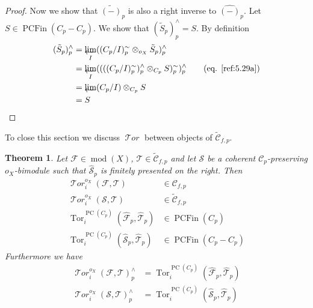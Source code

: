 \documentclass{amsproc}
\def\Cscr{{\mathcal C}}
\def\Fscr{{\mathcal F}}
\def\Sscr{{\mathcal S}}
\def\Tscr{{\mathcal T}}
\def\HTor{\operatorname {\Tscr \mathit{or}}}
\def\HTor{\operatorname {\Tscr \mathit{or}}}
\def\Tor{\operatorname {Tor}}
\def\coh{\operatorname {mod}}
\let\oldtext\text
\def\text#1{\oldtext{\upshape #1}}
\let\invlim\projlim
\DeclareMathOperator{\PC}{PC}
\DeclareMathOperator{\PCFin}{PCFin}
\newtheorem{theorems}[lemmas]{Theorem}
\theoremstyle{definition}
\theoremstyle{remark}
\def\invlim{\mathop{\vtop{\baselineskip -100pt\lineskip -1pt\lineskiplimit 0pt
\setbox0\hbox{\upshape lim}\copy0\hbox to \wd0{\leftarrowfill}}}\limits}
\numberwithin{equation}{section}
\numberwithin{table}{section}
\numberwithin{figure}{section}
\begin{document}
\begin{proof}
Now we show that $\tilde{(-)}_p$ is also a right inverse to
$\hat{(-)}_p$. Let $S\in \PCFin(C_p-C_p)$. We  show that
$(\tilde{S}_p)^\wedge_p=S$. By definition
\begin{align*}
(\tilde{S}_p)^\wedge_p&=\invlim_I
 ((C_p/I)^\sim_p\otimes_{o_X}
\tilde{S}_p)^\wedge_p\\
&=\invlim_I ((((C_p/I)^\sim_p)^\wedge_p\otimes_{C_p}
S)^\sim_p)^\wedge_p\qquad\text{(eq. \eqref{ref:5.29a})}\\
&=\invlim (C_p/I)\otimes_{C_p} S\\
&=S\qed
\end{align*}
\def\qed{}\end{proof}

To close this section we discuss $\HTor$ between objects of
$\tilde{\Cscr}_{f,p}$.
\begin{theorems}
\label{ref:5.5.10a}
Let $\Fscr\in \coh(X)$, $\Tscr\in \tilde{\Cscr}_{f,p}$ and let $\Sscr$
be a coherent $\Cscr_p$-preserving $o_X$-bimodule such that
$\hat{\Sscr}_p$ is finitely presented on the right. Then
\begin{align}
\label{ref:5.31a}
\HTor_i^{o_X}(\Fscr,\Tscr)&\in \Cscr_{f,p}\\
\label{ref:5.32a}
\HTor_i^{o_X}(\Sscr,\Tscr)&\in\tilde{\Cscr}_{f,p}\\
\label{ref:5.33a}
\Tor^{\PC(C_p)}_i(\hat{\Fscr}_p,\hat{\Tscr}_p)&\in \PCFin(C_p)\\
\label{ref:5.34a}
\Tor^{\PC(C_p)}_i(\hat{\Sscr}_p,\hat{\Tscr}_p)&\in \PCFin(C_p-C_p)
\end{align}
Furthermore we have
\begin{align}
\label{ref:5.35a}
\HTor_i^{o_X}(\Fscr,\Tscr)^\wedge_p&
=\Tor^{\PC(C_p)}_i(\hat{\Fscr}_p,\hat{\Tscr}_p)\\ 
\label{ref:5.36a}
\HTor_i^{o_X}(\Sscr,\Tscr)^\wedge_p&
=\Tor^{\PC(C_p)}_i(\hat{\Sscr}_p,\hat{\Tscr}_p)
\end{align}
\end{theorems} 
\end{document}
